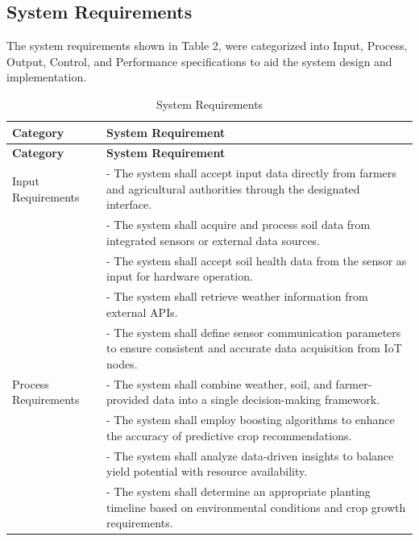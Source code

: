 {	\subsection{System Requirements}
	The system requirements shown in Table 2,  were categorized into Input, Process, Output, Control, and Performance specifications to aid the system design and implementation.
	
	\begin{longtable}{p{4cm} p{9cm}}
		\caption{System Requirements} \label{tab:SystemRequirements} \\
		\toprule
		\textbf{Category} & \textbf{System Requirement} \\
		\midrule
		\endfirsthead
		
		\toprule
		\textbf{Category} & \textbf{System Requirement} \\
		\midrule
		\endhead
		
		\bottomrule
		\endfoot
		
		Input Requirements & - The system shall accept input data directly from farmers and agricultural authorities through the designated interface. \\
		& - The system shall acquire and process soil data from integrated sensors or external data sources. \\
		& - The system shall accept soil health data from the sensor as input for hardware operation. \\
		& - The system shall retrieve weather information from external APIs. \\
		& -  The system shall define sensor communication
		parameters to ensure consistent and accurate data 
		acquisition from IoT nodes.\\
		\midrule
		
		Process Requirements & - The system shall combine weather, soil, and farmer-provided data into a single decision-making framework. \\
		& - The system shall employ boosting algorithms to enhance the accuracy of predictive crop recommendations. \\
		& - The system shall analyze data-driven insights to balance yield potential with resource availability. \\
		& - The system shall determine an appropriate planting timeline based on environmental conditions and crop growth requirements. \\
		\midrule
		

\end{longtable}}
